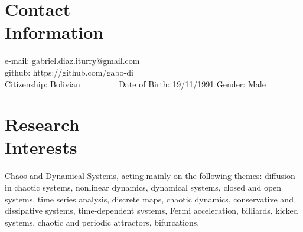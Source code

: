 \documentclass[margin,line]{resume}
\begin{document}
\begin{resume}

    \section{\mysidestyle Contact\\Information}
    \vspace{2mm}
    e-mail: gabriel.diaz.iturry@gmail.com  \vspace{0mm}\\\vspace{0mm}%
    github: https://github.com/gabo-di \vspace{0mm}\\\vspace{0mm}%
    Citizenship: Bolivian     ~~~~~~~~    Date of Birth: 19/11/1991   \hfill Gender: Male               \vspace{0mm}\\\vspace{4.5mm}%
    
    \section{\mysidestyle Research\\Interests}

    Chaos and Dynamical Systems, acting mainly on the following themes: diffusion in chaotic systems, nonlinear dynamics, dynamical systems, closed and open systems,  time series analysis, discrete maps, chaotic dynamics, 
    conservative and dissipative systems, time-dependent systems, Fermi acceleration, billiards,
    kicked systems, chaotic and periodic attractors, bifurcations.



\end{resume}
\end{document}
